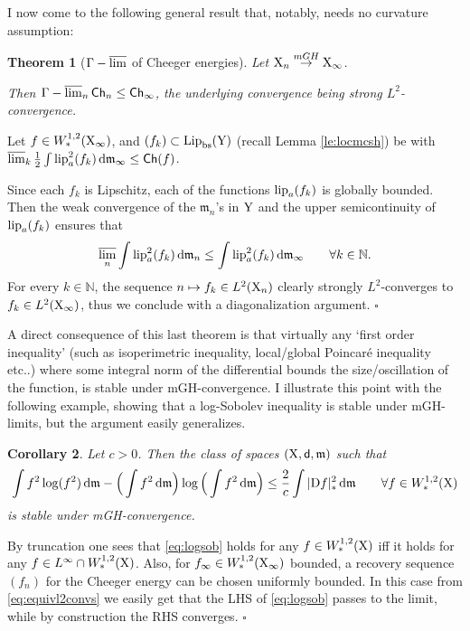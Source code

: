 \documentclass[11pt]{article}
\numberwithin{equation}{section}
\newtheorem{theorem}{Theorem}[section]
\newtheorem{corollary}[theorem]{Corollary}
\newenvironment{idea}{\removelastskip\par\medskip   %
\noindent{\em Idea of the proof} \rm}{\penalty-20\null\hfill$\square$\par\medbreak}
\newcommand{\N}{\mathbb{N}}
\newcommand{\X}{{\rm X}}
\newcommand{\Y}{{\rm Y}}
\newcommand{\sfd}{{\sf d}}
\newcommand{\mm}{{\mathfrak m}}
\newcommand{\ch}{{\sf Ch}}
\renewcommand{\d}{{\rm d}}
\newcommand{\D}{{\rm D}}
\newcommand{\Lip}{{\rm Lip}}
\newcommand{\lipa}{{\rm lip}_a}
\newcommand{\lims}{\varlimsup}
\newcommand{\bs}{{\rm bs}}
\begin{document}
I now come to the following general result that, notably, needs no curvature assumption:
\begin{theorem}[$\Gamma-\lims$ of Cheeger energies]\label{thm:glimsch}
Let $\X_n\stackrel{mGH}\to\X_\infty$.

Then   $\Gamma-\lims_n\ch_n \leq \ch_\infty$,
the underlying convergence being strong $L^2$-convergence.
\end{theorem}
\begin{idea}  Let $f\in W^{1,2}_*(\X_\infty)$,  and $(f_k)\subset\Lip_\bs(\Y)$ (recall  Lemma \ref{le:locmcsh}) be with $\lims_k \tfrac12\int\lipa^2(f_k)\,\d\mm_\infty\leq \ch(f)$.


Since each  $f_k$ is Lipschitz, each of the functions $\lipa(f_k)$ is globally bounded. Then  the weak convergence of the $\mm_n$'s in $\Y$ and the  upper semicontinuity of $\lipa(f_k)$  ensures that
\[
\lims_{n}\int\lipa^2(f_k)\,\d\mm_n\leq\int\lipa^2(f_k)\,\d\mm_\infty\qquad\forall k\in\N.
\]
For every $k\in\N$, the sequence $n\mapsto f_k\in L^2(\X_n)$ clearly strongly $ L^2$-converges to $f_k\in L^2(\X_\infty)$, thus we conclude with a diagonalization argument.
\end{idea}
A direct consequence of this last theorem is that virtually any `first order inequality' (such as isoperimetric inequality, local/global Poincar\'e inequality etc..) where some integral norm of the differential bounds the size/oscillation of the function, is stable under mGH-convergence. I illustrate this point with the following example, showing that  a log-Sobolev inequality is stable under mGH-limits, but the argument easily generalizes. 
\begin{corollary}\label{cor:stablogsob}
Let $c>0$. Then the class of spaces $(\X,\sfd,\mm)$ such that 
\begin{equation}
\label{eq:logsob}
\int f^2\log(f^2)\,\d\mm-\Big(\int f^2\,\d\mm\Big)\log\Big(\int f^2\,\d\mm\Big)\leq\frac2c\int|\D f|_*^2\,\d\mm\qquad\forall f\in W^{1,2}_*(\X)
\end{equation}
is stable under mGH-convergence.
\end{corollary}
\begin{idea} By truncation one sees that \eqref{eq:logsob} holds for any $f\in W^{1,2}_*(\X)$ iff it holds for any $f\in L^\infty\cap W^{1,2}_*(\X)$. Also,  for $f_\infty\in W^{1,2}_*(\X_\infty)$ bounded, a recovery sequence $(f_n)$ for the Cheeger energy can be chosen uniformly bounded. In this case from \eqref{eq:equivl2convs} we easily get that the LHS of \eqref{eq:logsob} passes to the limit, while by construction the RHS converges.
\end{idea}
\end{document}
